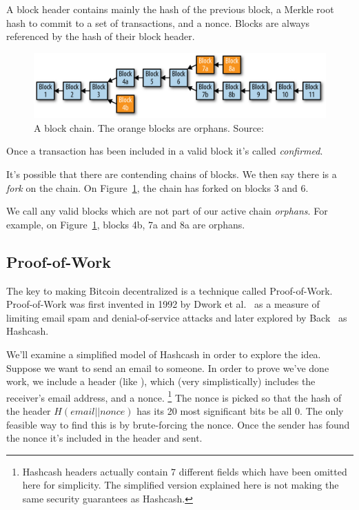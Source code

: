 A block header contains mainly the hash of the previous block, a Merkle root hash to commit to a set of transactions, and a nonce. Blocks are always referenced by the hash of their block header.

\begin{figure}
  \centering
  \includegraphics[width=0.9\columnwidth,keepaspectratio]{figures/blocks.png}
  \caption{A block chain. The orange blocks are orphans.  Source:~\cite{mastering}}
  \label{fig:blocks}
\end{figure}

Once a transaction has been included in a valid block it's called \emph{confirmed}.

It's possible that there are contending chains of blocks. We then say there is a \emph{fork} on the chain. On Figure~\ref{fig:blocks}, the chain has forked on blocks 3 and 6.

We call any valid blocks which are not part of our active chain \emph{orphans}. For example, on Figure~\ref{fig:blocks}, blocks 4b, 7a and 8a are orphans.

\subsection{Proof-of-Work}
The key to making Bitcoin decentralized is a technique called Proof-of-Work. Proof-of-Work was first invented in 1992 by Dwork et al.~\cite{dwork} as a measure of limiting email spam and denial-of-service attacks and later explored by Back~\cite{hashcash} as Hashcash.

We'll examine a simplified model of Hashcash in order to explore the idea. Suppose we want to send an email to someone. In order to prove we've done work, we include a header (like ), which (very simplistically) includes the receiver's email address, and a nonce.
\footnote{Hashcash headers actually contain 7 different fields which have been omitted here for simplicity. The simplified version explained here is not making the same security guarantees as Hashcash.}
The nonce is picked so that the hash of the header $H(email || nonce)$ has its 20 most significant bits be all 0. The only feasible way to find this is by brute-forcing the nonce. Once the sender has found the nonce it's included in the header and sent.

